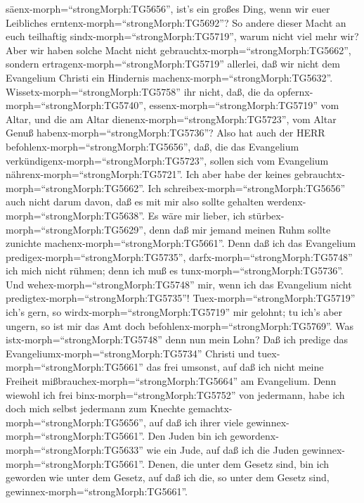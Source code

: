 säenx-morph=``strongMorph:TG5656'', ist's ein großes Ding, wenn wir euer
Leibliches erntenx-morph=``strongMorph:TG5692''?  So andere
dieser Macht an euch teilhaftig sindx-morph=``strongMorph:TG5719'',
warum nicht viel mehr wir? Aber wir haben solche Macht nicht
gebrauchtx-morph=``strongMorph:TG5662'', sondern
ertragenx-morph=``strongMorph:TG5719'' allerlei, daß wir nicht dem
Evangelium Christi ein Hindernis machenx-morph=``strongMorph:TG5632''.
 Wissetx-morph=``strongMorph:TG5758'' ihr nicht, daß, die
da opfernx-morph=``strongMorph:TG5740'',
essenx-morph=``strongMorph:TG5719'' vom Altar, und die am Altar
dienenx-morph=``strongMorph:TG5723'', vom Altar Genuß
habenx-morph=``strongMorph:TG5736''?  Also hat auch der
HERR befohlenx-morph=``strongMorph:TG5656'', daß, die das Evangelium
verkündigenx-morph=``strongMorph:TG5723'', sollen sich vom Evangelium
nährenx-morph=``strongMorph:TG5721''.  Ich aber habe der
keines gebrauchtx-morph=``strongMorph:TG5662''. Ich
schreibex-morph=``strongMorph:TG5656'' auch nicht darum davon, daß es
mit mir also sollte gehalten werdenx-morph=``strongMorph:TG5638''. Es
wäre mir lieber, ich stürbex-morph=``strongMorph:TG5629'', denn daß mir
jemand meinen Ruhm sollte zunichte machenx-morph=``strongMorph:TG5661''.
 Denn daß ich das Evangelium
predigex-morph=``strongMorph:TG5735'',
darfx-morph=``strongMorph:TG5748'' ich mich nicht rühmen; denn ich muß
es tunx-morph=``strongMorph:TG5736''. Und
wehex-morph=``strongMorph:TG5748'' mir, wenn ich das Evangelium nicht
predigtex-morph=``strongMorph:TG5735''! 
Tuex-morph=``strongMorph:TG5719'' ich's gern, so
wirdx-morph=``strongMorph:TG5719'' mir gelohnt; tu ich's aber ungern, so
ist mir das Amt doch befohlenx-morph=``strongMorph:TG5769''.
 Was istx-morph=``strongMorph:TG5748'' denn nun mein Lohn?
Daß ich predige das Evangeliumx-morph=``strongMorph:TG5734'' Christi und
tuex-morph=``strongMorph:TG5661'' das frei umsonst, auf daß ich nicht
meine Freiheit mißbrauchex-morph=``strongMorph:TG5664'' am Evangelium.
 Denn wiewohl ich frei binx-morph=``strongMorph:TG5752''
von jedermann, habe ich doch mich selbst jedermann zum Knechte
gemachtx-morph=``strongMorph:TG5656'', auf daß ich ihrer viele
gewinnex-morph=``strongMorph:TG5661''.  Den Juden bin ich
gewordenx-morph=``strongMorph:TG5633'' wie ein Jude, auf daß ich die
Juden gewinnex-morph=``strongMorph:TG5661''. Denen, die unter dem Gesetz
sind, bin ich geworden wie unter dem Gesetz, auf daß ich die, so unter
dem Gesetz sind, gewinnex-morph=``strongMorph:TG5661''. 
